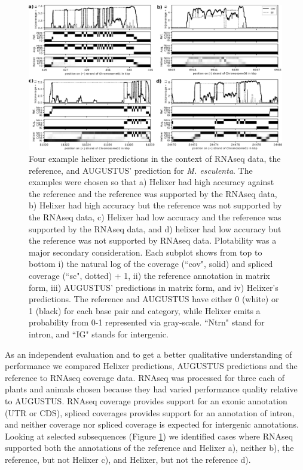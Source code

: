 \documentclass{bioinfo}
\begin{document}
\begin{figure}[!h]
\label{fig:cov_example_main}
\centerline{\includegraphics[width=\textwidth]{images/cov_examples/cov_example_main}}
\caption{Four example helixer predictions in the context of RNAseq data, the reference,
and AUGUSTUS' prediction for {\it M. esculenta}. The examples were chosen so
that a) Helixer had high accuracy against the reference and the reference
was supported by the RNAseq data, b) Helixer had high accuracy but the 
reference was not supported by the RNAseq data, c) Helixer had low accuracy
and the reference was supported by the RNAseq data, and d) helixer had low
accuracy but the reference was not supported by RNAseq data. Plotability was
a major secondary consideration. Each subplot shows from top to
bottom i) the natural log of the coverage (``cov", solid) and spliced coverage 
(``sc", dotted) + 1, ii) the reference annotation in matrix form, iii) 
AUGUSTUS' predictions in matrix form, and iv) Helixer's predictions. The reference
and AUGUSTUS have either 0 (white) or 1 (black) for each base pair and category, while
Helixer emits a probability from 0-1 represented via gray-scale. ``Ntrn" stand
for intron, and ``IG" stands for intergenic.
}
\end{figure}

As an independent evaluation and to get a better qualitative understanding of
performance we compared Helixer predictions, AUGUSTUS predictions and the
reference to RNAseq coverage data. RNAseq was processed for three each of plants
and animals chosen because they had varied performance quality relative to AUGUSTUS. 
RNAseq coverage provides support for an 
exonic annotation (UTR or CDS), spliced coverages provides support for an 
annotation of intron, and neither coverage nor spliced coverage is expected 
for intergenic annotations. Looking at selected subsequences (Figure \ref{fig:cov_example_main}) %
we identified cases where RNAseq supported both the annotations of the reference 
and Helixer a), neither b), the reference, but not Helixer c),
and Helixer, but not the reference d). 
\end{document}
